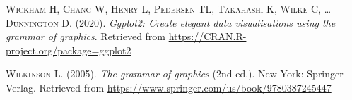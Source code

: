 \documentclass[
  a4paper,
]{article}
\begin{document}
\hypertarget{refs}{}
\leavevmode\hypertarget{ref-R-ggplot2}{}%
\textsc{Wickham H, Chang W, Henry L, Pedersen TL, Takahashi K, Wilke C, \ldots{} Dunnington D}. (2020). \emph{Ggplot2: Create elegant data visualisations using the grammar of graphics}. Retrieved from \url{https://CRAN.R-project.org/package=ggplot2}

\leavevmode\hypertarget{ref-wilkinson2005}{}%
\textsc{Wilkinson L}. (2005). \emph{The grammar of graphics} (2nd ed.). New-York: Springer-Verlag. Retrieved from \url{https://www.springer.com/us/book/9780387245447}
\end{document}

